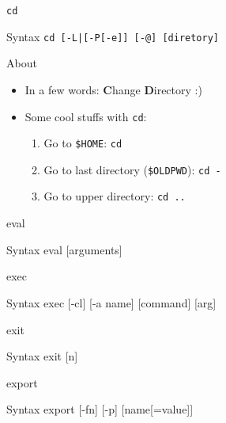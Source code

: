 \documentclass[10pt, compress, aspectratio=169]{beamer}
\begin{document}
\begin{frame}{\texttt{cd}}
  \begin{alertblock}{Syntax}
    \texttt{cd [-L|[-P[-e]] [-@] [diretory]}
  \end{alertblock}

  \begin{exampleblock}{About}
    \begin{itemize}
      \item In a few words: \textbf{C}hange \textbf{D}irectory :)
      \item Some cool stuffs with \texttt{cd}:
        \begin{enumerate}
          \item Go to \texttt{\$HOME}: \texttt{cd}
          \item Go to last directory (\texttt{\$OLDPWD}): \texttt{cd -}
          \item Go to upper directory: \texttt{cd ..}
        \end{enumerate}
    \end{itemize}
  \end{exampleblock}
\end{frame}

\begin{frame}{eval}
  \begin{alertblock}{Syntax}
    eval [arguments]
  \end{alertblock}
  
\end{frame}

\begin{frame}{exec}
  \begin{alertblock}{Syntax}
    exec [-cl] [-a name] [command] [arg]
  \end{alertblock}
  
\end{frame}

\begin{frame}{exit}
  \begin{alertblock}{Syntax}
    exit [n]
  \end{alertblock}
\end{frame}

\begin{frame}{export}
  \begin{alertblock}{Syntax}
    export [-fn] [-p] [name[=value]]
  \end{alertblock}
\end{frame}
\end{document}
